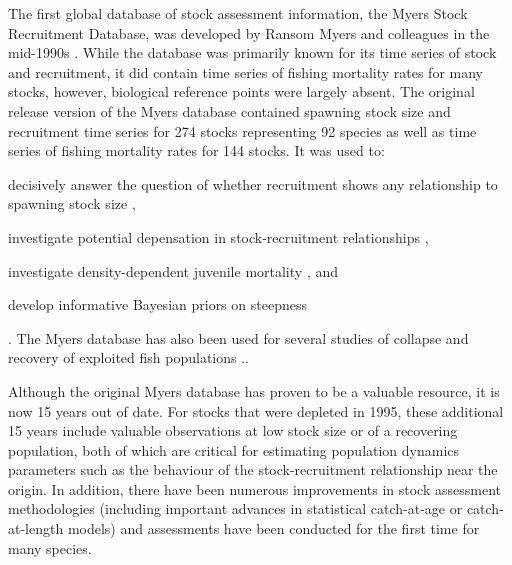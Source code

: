 \documentclass[letterpaper,12pt]{article}
\begin{document}
The first global database of stock assessment information, the Myers
Stock Recruitment Database, was developed by Ransom Myers and
colleagues in the mid-1990s \citep{Myers:etal:1995:summary}.  While
the database was primarily known for its time series of stock and
recruitment, it did contain time series of fishing mortality rates for
many stocks, however, biological reference points were largely absent. The
original release version of the Myers database
\citep{Myers:etal:1995:summary} contained spawning stock size and
recruitment time series for 274 stocks representing 92 species as well
as time series of fishing mortality rates for 144 stocks. It was used
to: \begin{inparaenum}[1\upshape)] \item decisively answer the
  question of whether recruitment shows any relationship to spawning
  stock size \citep{Myers:Barrowman:1996:fishbull}, \item investigate
  potential depensation in stock-recruitment relationships
  \citep{Myers:etal:1995:science, Liermann:Hilborn:1997:cjfas,
    Garvey:etal:2009:cjfas}, \item investigate density-dependent
  juvenile mortality \citep{Myers:2001:ices, Minto:etal:2008:nature},
  and \item develop informative Bayesian priors on steepness
  \citep{Myers:etal:1999:cjfas, Myers:etal:2002:najfm,
    Dorn:2002:najfm} \end{inparaenum}.  The Myers
database has also been used for several studies of collapse and
recovery of exploited fish populations \citep{Hutchings:2000:nature,
  Hutchings:2001:jfishb, Hilborn:1997:csiro}..

Although the original Myers database \citep{Myers:etal:1995:summary}
has proven to be a valuable resource, it is now 15 years out of date.
For stocks that were depleted in 1995, these additional 15 years
include valuable observations at low stock size or of a recovering
population, both of which are critical for estimating population
dynamics parameters such as the behaviour of the stock-recruitment
relationship near the origin. In addition, there have been numerous improvements in
stock assessment methodologies (including important advances in
statistical catch-at-age or catch-at-length models) and assessments
have been conducted for the first time for many species.
\end{document}
